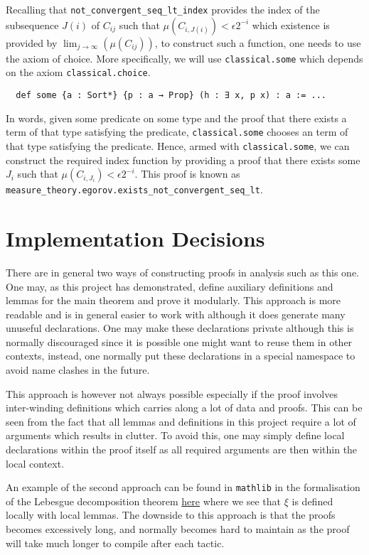 \documentclass[]{article}
\theoremstyle{definition}
\begin{document}
Recalling that \texttt{not_convergent_seq_lt_index} provides the index 
of the subsequence \(J(i)\) of \(C_{ij}\) such that \(\mu(C_{i,J(i)}) < \epsilon 2^{-i}\)
which existence is provided by \(\lim_{j \to \infty}(\mu(C_{ij}))\), to construct 
such a function, one needs to use the axiom of choice. More specifically, 
we will use \texttt{classical.some} which depends on the axiom 
\texttt{classical.choice}.
\begin{verbatim}
  def some {a : Sort*} {p : a → Prop} (h : ∃ x, p x) : a := ...
\end{verbatim}
In words, given some predicate on some type and the proof that there exists a term 
of that type satisfying the predicate, \texttt{classical.some} chooses an 
term of that type satisfying the predicate. Hence, armed with \texttt{classical.some},
we can construct the required index function by providing a proof 
that there exists some \(J_i\) such that \(\mu(C_{i, J_i}) < \epsilon 2^{-i}\).
This proof is known as \texttt{measure_theory.egorov.exists_not_convergent_seq_lt}.

\section*{Implementation Decisions}

There are in general two ways of constructing proofs in analysis such as this one. 
One may, as this project has demonstrated, define auxiliary definitions and lemmas 
for the main theorem and prove it modularly. This approach is more readable and 
is in general easier to work with although it does generate many unuseful 
declarations. One may make these declarations private although this is normally 
discouraged since it is possible one might want to reuse them in other contexts, 
instead, one normally put these declarations in a special namespace to avoid 
name clashes in the future.

This approach is however not always possible especially if the proof involves 
inter-winding definitions which carries along a lot of data and proofs. This can 
be seen from the fact that all lemmas and definitions in this project require 
a lot of arguments which results in clutter. To avoid this, one may simply 
define local declarations within the proof itself as all required arguments are 
then within the local context. 

An example of the second approach can be found in \texttt{mathlib} in the formalisation 
of the Lebesgue decomposition theorem 
\href{https://github.com/leanprover-community/mathlib/blob/master/src/measure_theory/decomposition/lebesgue.lean#L604}{here}
where we see that \(\xi\) is defined locally with local lemmas. The downside to this 
approach is that the proofs becomes excessively long, and normally becomes hard 
to maintain as the proof will take much longer to compile after each tactic.  
\end{document}
